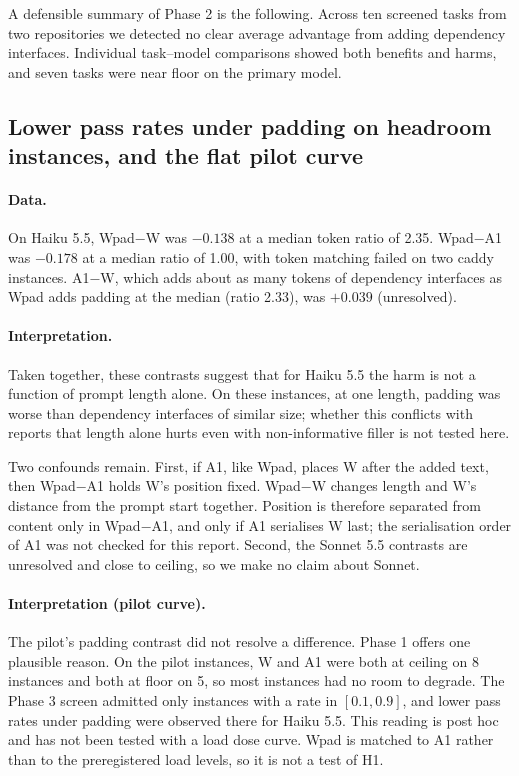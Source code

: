 \documentclass[10pt]{article}
\begin{document}
A defensible summary of Phase 2 is the following. Across ten screened tasks from two repositories we detected no clear average advantage from adding dependency interfaces. Individual task--model comparisons showed both benefits and harms, and seven tasks were near floor on the primary model.

\subsection{Lower pass rates under padding on headroom instances, and the flat pilot curve}

\paragraph{Data.} On Haiku 5.5, Wpad$-$W was $-0.138$ at a median token ratio of 2.35. Wpad$-$A1 was $-0.178$ at a median ratio of 1.00, with token matching failed on two caddy instances. A1$-$W, which adds about as many tokens of dependency interfaces as Wpad adds padding at the median (ratio 2.33), was $+0.039$ (unresolved).

\paragraph{Interpretation.} Taken together, these contrasts suggest that for Haiku 5.5 the harm is not a function of prompt length alone. On these instances, at one length, padding was worse than dependency interfaces of similar size; whether this conflicts with reports that length alone hurts even with non-informative filler \cite{du2025} is not tested here.

Two confounds remain. First, if A1, like Wpad, places W after the added text, then Wpad$-$A1 holds W's position fixed. Wpad$-$W changes length and W's distance from the prompt start together. Position \cite{liu2024} is therefore separated from content only in Wpad$-$A1, and only if A1 serialises W last; the serialisation order of A1 was not checked for this report. Second, the Sonnet 5.5 contrasts are unresolved and close to ceiling, so we make no claim about Sonnet.

\paragraph{Interpretation (pilot curve).} The pilot's padding contrast did not resolve a difference. Phase 1 offers one plausible reason. On the pilot instances, W and A1 were both at ceiling on 8 instances and both at floor on 5, so most instances had no room to degrade. The Phase 3 screen admitted only instances with a rate in $[0.1, 0.9]$, and lower pass rates under padding were observed there for Haiku 5.5. This reading is post hoc and has not been tested with a load dose curve. Wpad is matched to A1 rather than to the preregistered load levels, so it is not a test of H1.
\end{document}
